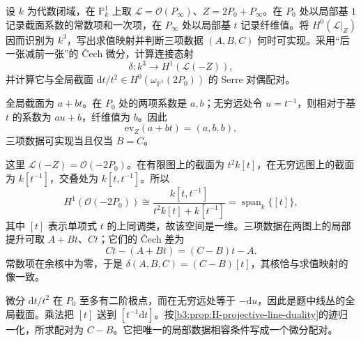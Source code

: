 \begin{exercise}\label{b3:ex:H-jet-evaluation-obstruction}
	设 \(k\) 为代数闭域，在 \(\mathbb P_k^1\) 上取 \(\mathcal L=\mathcal O(P_\infty)\)、\(Z=2P_0+P_\infty\)。在 \(P_0\) 处以局部基 \(1\) 记录截面系数的常数项和一次项，在 \(P_\infty\) 处以局部基 \(t\) 记录纤维值。将 \(H^0(\mathcal L|_Z)\) 因而识别为 \(k^3\)，写出求值映射并判断三项数据 \((A,B,C)\) 何时可实现。采用“后一张减前一张”的 Čech 微分，计算连接态射
	\[
		\delta:k^3\longrightarrow H^1(\mathcal L(-Z)),
	\]
	并计算它与全局截面 \(\mathrm{d}t/t^2\in H^0(\omega_{\mathbb P^1}(2P_0))\) 的 Serre 对偶配对。
\end{exercise}
\begin{solution}
	全局截面为 \(a+bt\)。在 \(P_0\) 处的两项系数是 \(a,b\)；无穷远处令 \(u=t^{-1}\)，则相对于基 \(t\) 的系数为 \(au+b\)，纤维值为 \(b\)。因此
	\[
		\mathrm{ev}_Z(a+bt)=(a,b,b),
	\]
	三项数据可实现当且仅当 \(B=C\)。

	这里 \(\mathcal L(-Z)=\mathcal O(-2P_0)\)。在有限图上的截面为 \(t^2k[t]\)，在无穷远图上的截面为 \(k[t^{-1}]\)，交叠处为 \(k[t,t^{-1}]\)。所以
	\[
		H^1(\mathcal O(-2P_0))
		\cong\frac{k[t,t^{-1}]}{t^2k[t]+k[t^{-1}]}
		=\operatorname{span}_k\{[t]\},
	\]
	其中 \([t]\) 表示单项式 \(t\) 的上同调类，故该空间是一维。三项数据在两图上的局部提升可取 \(A+Bt\)、\(Ct\)；它们的 Čech 差为
	\[
		Ct-(A+Bt)=(C-B)t-A.
	\]
	常数项在余核中为零，于是 \(\delta(A,B,C)=(C-B)[t]\)，其核恰与求值映射的像一致。

	微分 \(\mathrm{d}t/t^2\) 在 \(P_0\) 至多有二阶极点，而在无穷远处等于 \(-\mathrm{d}u\)，因此是题中线丛的全局截面。乘法把 \([t]\) 送到 \([t^{-1}\mathrm{d}t]\)。按\cref{b3:prop:H-projective-line-duality}的迹归一化，所求配对为 \(C-B\)。它把唯一的局部数据相容条件写成一个微分配对。
\end{solution}

